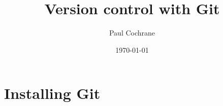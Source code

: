 \documentclass{git_course}
\begin{document}
\author{Paul Cochrane}
\title[Version control with Git]
        {Version control with Git}
\date{\today}

\maketitle

\begin{frame}
\begin{multicols}{2}
\begin{spacing}{0.8}
\tableofcontents
\end{spacing}
\end{multicols}
\end{frame}





\section{Installing Git}
\end{document}

